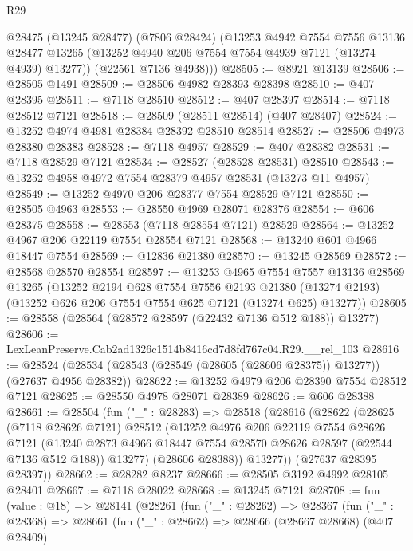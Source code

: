 \begin{lexlean}{R29}
\begin{coremodule}
      @28475
        (@13245 @28477)
        (@7806 @28424)
        (@13253
          @4942
          @7554
          @7556
          @13136
          @28477
          @13265
          (@13252 @4940 @206 @7554 @7554 @4939 @7121 (@13274 @4939) @13277))
        (@22561 @7136 @4938)))
@28505 := @8921 @13139
@28506 := @28505 @1491
@28509 := @28506 @4982 @28393 @28398
@28510 := @407 @28395
@28511 := @7118 @28510
@28512 := @407 @28397
@28514 := @7118 @28512 @7121
@28518 := @28509 (@28511 @28514) (@407 @28407)
@28524 := @13252 @4974 @4981 @28384 @28392 @28510 @28514
@28527 := @28506 @4973 @28380 @28383
@28528 := @7118 @4957
@28529 := @407 @28382
@28531 := @7118 @28529 @7121
@28534 := @28527 (@28528 @28531) @28510
@28543 := @13252 @4958 @4972 @7554 @28379 @4957 @28531 (@13273 @11 @4957)
@28549 := @13252 @4970 @206 @28377 @7554 @28529 @7121
@28550 := @28505 @4963
@28553 := @28550 @4969 @28071 @28376
@28554 := @606 @28375
@28558 := @28553 (@7118 @28554 @7121) @28529
@28564 := @13252 @4967 @206 @22119 @7554 @28554 @7121
@28568 := @13240 @601 @4966 @18447 @7554
@28569 := @12836 @21380
@28570 := @13245 @28569
@28572 := @28568 @28570 @28554
@28597 := @13253
    @4965
    @7554
    @7557
    @13136
    @28569
    @13265
    (@13252
      @2194
      @628
      @7554
      @7556
      @2193
      @21380
      (@13274 @2193)
      (@13252 @626 @206 @7554 @7554 @625 @7121 (@13274 @625) @13277))
@28605 := @28558 (@28564 (@28572 @28597 (@22432 @7136 @512 @188)) @13277)
@28606 := LexLeanPreserve.Cab2ad1326c1514b8416cd7d8fd767c04.R29.__rel_103
@28616 := @28524 (@28534 (@28543 (@28549 (@28605 (@28606 @28375)) @13277)) (@27637 @4956 @28382))
@28622 := @13252 @4979 @206 @28390 @7554 @28512 @7121
@28625 := @28550 @4978 @28071 @28389
@28626 := @606 @28388
@28661 := @28504
    (fun ("_" : @28283) =>
    @28518
      (@28616
        (@28622
          (@28625
            (@7118 @28626 @7121)
            @28512
            (@13252
              @4976
              @206
              @22119
              @7554
              @28626
              @7121
              (@13240 @2873 @4966 @18447 @7554 @28570 @28626 @28597 (@22544 @7136 @512 @188))
              @13277)
            (@28606 @28388))
          @13277))
      (@27637 @28395 @28397))
@28662 := @28282 @8237
@28666 := @28505 @3192 @4992 @28105 @28401
@28667 := @7118 @28022
@28668 := @13245 @7121
@28708 := fun (value : @18) =>
  @28141
    (@28261
      (fun ("_" : @28262) =>
      @28367
        (fun ("_" : @28368) =>
        @28661
          (fun ("_" : @28662) =>
          @28666
            (@28667 @28668)
            (@407 @28409)

\end{coremodule}
\end{lexlean}
